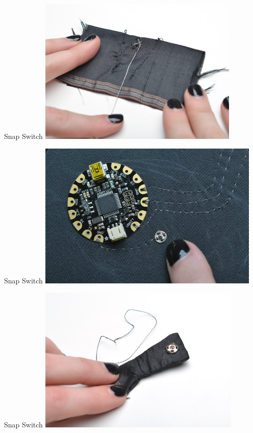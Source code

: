 \documentclass[aspectratio=169]{beamer}
\begin{document}
\begin{frame}[fragile]{Snap Switch}
\includegraphics[height=2.75in]{flora-angler-embroidery-20.jpg}
\end{frame}
\begin{frame}[fragile]{Snap Switch}
\includegraphics[height=2.75in]{flora-angler-embroidery-21a.jpg}
\end{frame}
\begin{frame}[fragile]{Snap Switch}
\includegraphics[height=2.75in]{flora-angler-embroidery-21.jpg}
\end{frame}
\end{document}
